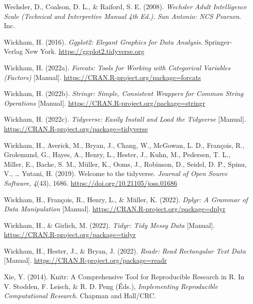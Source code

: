 \documentclass[
  12pt,
]{article}
\newlength{\cslhangindent}
\newlength{\cslentryspacingunit} %
\newenvironment{CSLReferences}[2] %
 {%
  \setlength{\parindent}{0pt}
  \ifodd #1
  \let\oldpar\par
  \def\par{\hangindent=\cslhangindent\oldpar}
  \fi
  \setlength{\parskip}{#2\cslentryspacingunit}
 }%
 {}
\begin{document}
\begin{CSLReferences}{1}{0}
\leavevmode{}%
Wechsler, D., Coalson, D. L., \& Raiford, S. E. (2008). \emph{Wechsler
Adult Intelligence Scale ({Technical} and Interpretive Manual 4th Ed.).
{San Antonio}: {NCS Pearson}}. {Inc}.

\leavevmode{}%
Wickham, H. (2016). \emph{Ggplot2: {Elegant} Graphics for Data
Analysis}. {Springer-Verlag New York}.
\url{https://ggplot2.tidyverse.org}

\leavevmode{}%
Wickham, H. (2022a). \emph{Forcats: {Tools} for Working with Categorical
Variables (Factors)} {[}Manual{]}.
\url{https://CRAN.R-project.org/package=forcats}

\leavevmode{}%
Wickham, H. (2022b). \emph{Stringr: {Simple}, Consistent Wrappers for
Common String Operations} {[}Manual{]}.
\url{https://CRAN.R-project.org/package=stringr}

\leavevmode{}%
Wickham, H. (2022c). \emph{Tidyverse: {Easily} Install and Load the
Tidyverse} {[}Manual{]}.
\url{https://CRAN.R-project.org/package=tidyverse}

\leavevmode{}%
Wickham, H., Averick, M., Bryan, J., Chang, W., McGowan, L. D.,
François, R., Grolemund, G., Hayes, A., Henry, L., Hester, J., Kuhn, M.,
Pedersen, T. L., Miller, E., Bache, S. M., Müller, K., Ooms, J.,
Robinson, D., Seidel, D. P., Spinu, V., \ldots{} Yutani, H. (2019).
Welcome to the {tidyverse}. \emph{Journal of Open Source Software},
\emph{4}(43), 1686. \url{https://doi.org/10.21105/joss.01686}

\leavevmode{}%
Wickham, H., François, R., Henry, L., \& Müller, K. (2022). \emph{Dplyr:
{A} Grammar of Data Manipulation} {[}Manual{]}.
\url{https://CRAN.R-project.org/package=dplyr}

\leavevmode{}%
Wickham, H., \& Girlich, M. (2022). \emph{Tidyr: {Tidy} Messy Data}
{[}Manual{]}. \url{https://CRAN.R-project.org/package=tidyr}

\leavevmode{}%
Wickham, H., Hester, J., \& Bryan, J. (2022). \emph{Readr: {Read}
Rectangular Text Data} {[}Manual{]}.
\url{https://CRAN.R-project.org/package=readr}

\leavevmode{}%
Xie, Y. (2014). Knitr: {A} Comprehensive Tool for Reproducible Research
in {R}. In V. Stodden, F. Leisch, \& R. D. Peng (Éds.),
\emph{Implementing Reproducible Computational Research}. {Chapman and
Hall/CRC}.


\end{CSLReferences}
\end{document}

